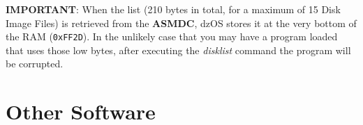 \documentclass[a4paper,11pt]{article}
\begin{document}
        \textbf{IMPORTANT}: When the list (210 bytes in total, for a maximum of
        15 Disk Image Files) is retrieved from the \textbf{ASMDC}, dzOS stores
        it at the very bottom of the RAM (\texttt{0xFF2D}). In the unlikely case
        that you may have a program loaded that uses those low bytes, after
        executing the \textit{disklist} command the program will be corrupted.


        
        

        



        

    \pagebreak
    \section{Other Software}
\end{document}
